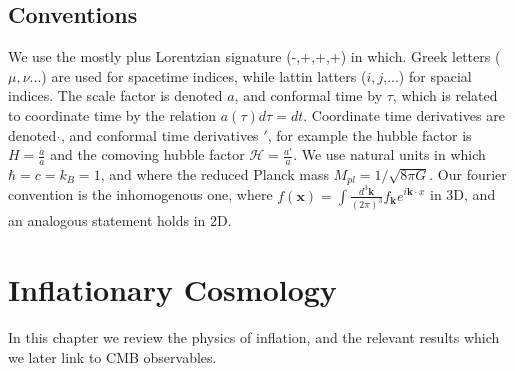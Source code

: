\documentclass[a4paper,10pt]{article}
\renewcommand{\v}[1]{\mathbf{#1}}
\newcommand{\Mp}{M_{pl}}
\newcommand{\fint}[1]{\int \frac{d^3 \v{#1}}{(2\pi)^3}}
\begin{document}
\subsection{Conventions}

We use the mostly plus Lorentzian signature (-,+,+,+) in which. Greek letters ($\mu,\nu$...) are used for spacetime indices, while lattin latters ($i,j$,...) for spacial indices. The scale factor is denoted $a$, and conformal time by $\tau$, which is related to coordinate time by the relation $a(\tau)d\tau = dt$. Coordinate time derivatives are denoted $\dot{}$, and conformal time derivatives $'$, for example the hubble factor is $H=\frac{\dot{a}}{a}$ and the comoving hubble factor $\mathcal{H}=\frac{a'}{a}$. We use natural units in which $\hbar=c=k_B=1$, and where the reduced Planck mass $\Mp = 1/\sqrt{8\pi G}$. Our fourier convention is the inhomogenous one, where $f(\v{x}) = \fint{k} f_\v{k}e^{i\v{k}\cdot{x}}$ in 3D, and an analogous statement holds in 2D.


\newpage
\section{Inflationary Cosmology}
\nocite{*}

In this chapter we review the physics of inflation, and the relevant results which we later link to CMB observables.
\end{document}
